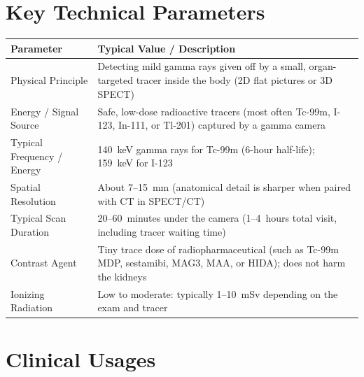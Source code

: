 \section{Key Technical Parameters}
\noindent
\begin{tabularx}{\textwidth}{@{}l X@{}}
\toprule
\textbf{Parameter} & \textbf{Typical Value / Description} \\
\midrule
Physical Principle & Detecting mild gamma rays given off by a small, organ-targeted tracer inside the body (2D flat pictures or 3D SPECT) \\
Energy / Signal Source & Safe, low-dose radioactive tracers (most often Tc-99m, I-123, In-111, or Tl-201) captured by a gamma camera \\
Typical Frequency / Energy & 140~keV gamma rays for Tc-99m (6-hour half-life); 159~keV for I-123 \\
Spatial Resolution & About 7--15~mm (anatomical detail is sharper when paired with CT in SPECT/CT) \\
Typical Scan Duration & 20--60~minutes under the camera (1--4~hours total visit, including tracer waiting time) \\
Contrast Agent & Tiny trace dose of radiopharmaceutical (such as Tc-99m MDP, sestamibi, MAG3, MAA, or HIDA); does not harm the kidneys \\
Ionizing Radiation & Low to moderate: typically 1--10~mSv depending on the exam and tracer \\
\bottomrule
\end{tabularx}

\section{Clinical Usages}

